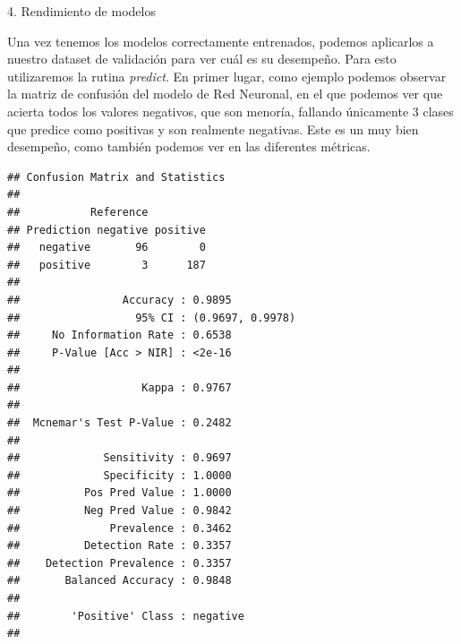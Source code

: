 \documentclass[
]{article}
\newenvironment{Shaded}{\begin{snugshade}}{\end{snugshade}}
\newcommand{\FunctionTok}[1]{\textcolor[rgb]{0.13,0.29,0.53}{\textbf{#1}}}
\newcommand{\NormalTok}[1]{#1}
\newcommand{\OtherTok}[1]{\textcolor[rgb]{0.56,0.35,0.01}{#1}}
\newcommand{\SpecialCharTok}[1]{\textcolor[rgb]{0.81,0.36,0.00}{\textbf{#1}}}
\begin{document}
4. Rendimiento de modelos

Una vez tenemos los modelos correctamente entrenados, podemos aplicarlos
a nuestro dataset de validación para ver cuál es su desempeño. Para esto
utilizaremos la rutina \emph{predict}. En primer lugar, como ejemplo
podemos observar la matriz de confusión del modelo de Red Neuronal, en
el que podemos ver que acierta todos los valores negativos, que son
menoría, fallando únicamente 3 clases que predice como positivas y son
realmente negativas. Este es un muy bien desempeño, como también podemos
ver en las diferentes métricas.

\begin{Shaded}
\end{Shaded}

\begin{verbatim}
## Confusion Matrix and Statistics
## 
##           Reference
## Prediction negative positive
##   negative       96        0
##   positive        3      187
##                                           
##                Accuracy : 0.9895          
##                  95% CI : (0.9697, 0.9978)
##     No Information Rate : 0.6538          
##     P-Value [Acc > NIR] : <2e-16          
##                                           
##                   Kappa : 0.9767          
##                                           
##  Mcnemar's Test P-Value : 0.2482          
##                                           
##             Sensitivity : 0.9697          
##             Specificity : 1.0000          
##          Pos Pred Value : 1.0000          
##          Neg Pred Value : 0.9842          
##              Prevalence : 0.3462          
##          Detection Rate : 0.3357          
##    Detection Prevalence : 0.3357          
##       Balanced Accuracy : 0.9848          
##                                           
##        'Positive' Class : negative        
## 
\end{verbatim}
\end{document}
